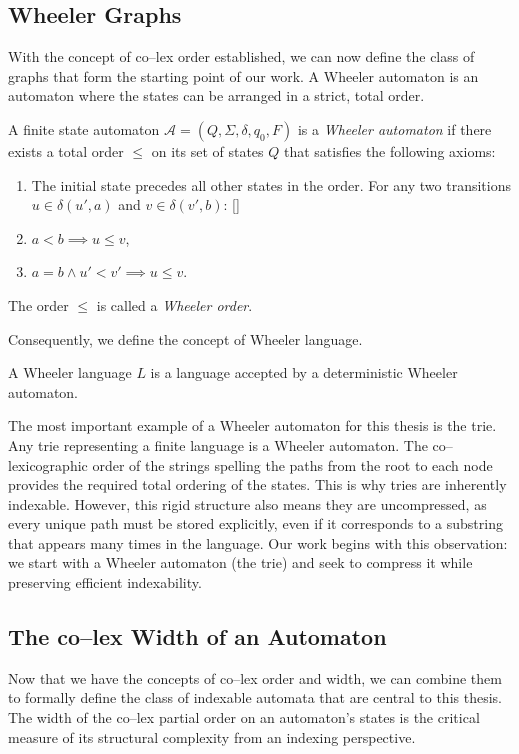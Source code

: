 \subsection{Wheeler Graphs}
With the concept of co--lex order established, we can now define the class of graphs that form the starting point of our work. A Wheeler automaton is an automaton where the states can be arranged in a strict, total order.

\begin{definition}
    \label{def:wheeler_automaton}
    \sloppy
    A finite state automaton $\mathcal{A} = (Q, \Sigma, \delta, q_0, F)$ is a \textit{Wheeler automaton} if there exists a total order $\leq$ on its set of states $Q$ that satisfies the following axioms:
    \begin{enumerate}
        \item The initial state precedes all other states in the order.
    For any two transitions $u \in \delta(u', a)$ and $v \in \delta(v', b)$:
    [{}]
        \item $a<b \implies u \leq v$,
        \item $a=b \wedge u' < v' \implies u \leq v$.
    \end{enumerate}
    The order $\leq$ is called a \textit{Wheeler order}.
\end{definition}

Consequently, we define the concept of Wheeler language.
\begin{definition}
    A Wheeler language $L$ is a language accepted by a deterministic Wheeler automaton.
\end{definition}

The most important example of a Wheeler automaton for this thesis is the trie. Any trie representing a finite language is a Wheeler automaton. The co--lexicographic order of the strings spelling the paths from the root to each node provides the required total ordering of the states. This is why tries are inherently indexable. However, this rigid structure also means they are uncompressed, as every unique path must be stored explicitly, even if it corresponds to a substring that appears many times in the language. Our work begins with this observation: we start with a Wheeler automaton (the trie) and seek to compress it while preserving efficient indexability.

\subsection{The co--lex Width of an Automaton}
Now that we have the concepts of co--lex order and width, we can combine them to formally define the class of indexable automata that are central to this thesis. The width of the co--lex partial order on an automaton's states is the critical measure of its structural complexity from an indexing perspective.

